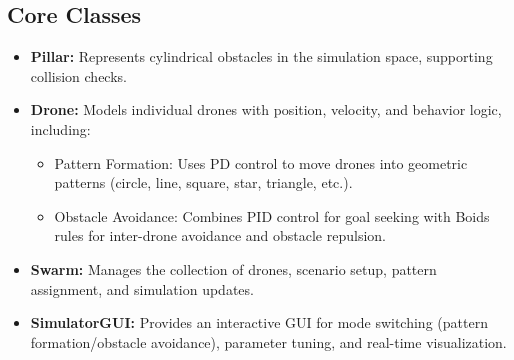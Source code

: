 \documentclass[11pt]{article}
\begin{document}
\subsection{Core Classes}
\begin{itemize}
    \item \textbf{Pillar:} Represents cylindrical obstacles in the simulation space, supporting collision checks.
    \item \textbf{Drone:} Models individual drones with position, velocity, and behavior logic, including:
    \begin{itemize}
        \item Pattern Formation: Uses PD control to move drones into geometric patterns (circle, line, square, star, triangle, etc.).
        \item Obstacle Avoidance: Combines PID control for goal seeking with Boids rules for inter-drone avoidance and obstacle repulsion.
    \end{itemize}
    \item \textbf{Swarm:} Manages the collection of drones, scenario setup, pattern assignment, and simulation updates.
    \item \textbf{SimulatorGUI:} Provides an interactive GUI for mode switching (pattern formation/obstacle avoidance), parameter tuning, and real-time visualization.
\end{itemize}
\newpage
\end{document}
